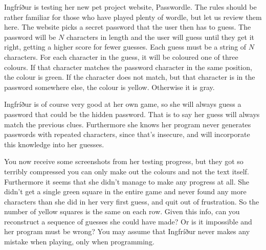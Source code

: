 

Ingfríður is testing her new pet project website, Passwordle.
The rules should be rather familiar for those who have played
plenty of wordle, but let us review them here. The website picks
a secret password that the user then has to guess. The password
will be $N$ characters in length and the user will guess until
they get it right, getting a higher score for fewer guesses.
Each guess must be a string of $N$ characters. For each character
in the guess, it will be coloured one of three colours. If that
character matches the password character in the same position,
the colour is green. If the character does not match, but that
character is in the password somewhere else, the colour is
yellow. Otherwise it is gray.

Ingfríður is of course very good at her own game, so she will
always guess a password that could be the hidden password.
That is to say her guess will always match the previous clues.
Furthermore she knows her program never generates passwords with
repeated characters, since that's insecure, and will incorporate
this knowledge into her guesses.

You now receive some screenshots from her testing progress, but
they got so terribly compressed you can only make out the colours
and not the text itself. Furthermore it seems that she didn't 
manage to make any progress at all. She didn't get a single green
square in the entire game and never found any more characters than
she did in her very first guess, and quit
out of frustration. So the number of yellow squares is the same
on each row. Given this info, can you reconstruct a
sequence of guesses she could have made? Or is it impossible and
her program must be wrong? You may assume that Ingfríður never
makes any mistake when playing, only when programming.

